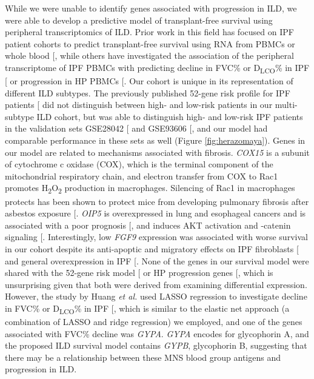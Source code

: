 \documentclass[
]{article}
\begin{document}
While we were unable to identify genes associated with progression in ILD, we were able to develop a predictive model of transplant-free survival using peripheral transcriptomics of ILD. Prior work in this field has focused on IPF patient cohorts to predict transplant-free survival using RNA from PBMCs or whole blood {[}\citeproc{ref-molyneaux_host-microbial_2017}{55}{]}, while others have investigated the association of the peripheral transcriptome of IPF PBMCs with predicting decline in FVC\% or D\textsubscript{LCO}\% in IPF {[}\citeproc{ref-huang_blood_2021}{101}{]} or progression in HP PBMCs {[}\citeproc{ref-fernandez_perez_prognostic_2022}{102}{]}. Our cohort is unique in its representation of different ILD subtypes. The previously published 52-gene risk profile for IPF patients {[}\citeproc{ref-herazo-maya_validating_2017}{100}{]} did not distinguish between high- and low-risk patients in our multi-subtype ILD cohort, but was able to distinguish high- and low-risk IPF patients in the validation sets GSE28042 {[}\citeproc{ref-herazo-maya_validating_2017}{100}{]} and GSE93606 {[}\citeproc{ref-molyneaux_host-microbial_2017}{55}{]}, and our model had comparable performance in these sets as well (Figure \ref{fig:herazomaya}). Genes in our model are related to mechanisms associated with fibrosis. \textit{COX15} is a subunit of cytochrome c oxidase (COX), which is the terminal component of the mitochondrial respiratory chain, and electron transfer from COX to Rac1 promotes H\textsubscript{2}O\textsubscript{2} production in macrophages. Silencing of Rac1 in macrophages protects has been shown to protect mice from developing pulmonary fibrosis after asbestos exposure {[}\citeproc{ref-osborn-heaford_mitochondrial_2012}{141}{]}. \textit{OIP5} is overexpressed in lung and esophageal cancers and is associated with a poor prognosis {[}\citeproc{ref-koinuma_characterization_2012}{142}{]}, and induces AKT activation and \beta-catenin signaling {[}\citeproc{ref-li_oip5_2017}{143}{]}. Interestingly, low \textit{FGF9} expression was associated with worse survival in our cohort despite its anti-apoptic and migratory effects on IPF fibroblasts {[}\citeproc{ref-joannes_fgf9_2016}{144}{]} and general overexpression in IPF {[}\citeproc{ref-coffey_expression_2013}{145}{]}. None of the genes in our survival model were shared with the 52-gene risk model {[}\citeproc{ref-herazo-maya_peripheral_2013}{59}{]} or HP progression genes {[}\citeproc{ref-fernandez_perez_prognostic_2022}{102}{]}, which is unsurprising given that both were derived from examining differential expression. However, the study by Huang \textit{et al.} used LASSO regression to investigate decline in FVC\% or D\textsubscript{LCO}\% in IPF {[}\citeproc{ref-huang_blood_2021}{101}{]}, which is similar to the elastic net approach (a combination of LASSO and ridge regression) we employed, and one of the genes associated with FVC\% decline was \textit{GYPA}. \textit{GYPA} encodes for glycophorin A, and the proposed ILD survival model contains \textit{GYPB}, glycophorin B, suggesting that there may be a relationship between these MNS blood group antigens and progression in ILD.
\end{document}
